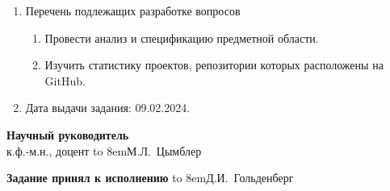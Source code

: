 \begin{adjustwidth}{-1.5cm}{0.5cm}
\begin{linespread}{1}
{\begin{enumerate}
	\bf\item Перечень подлежащих разработке вопросов\rm
	\begin{enumerate}
		\item Провести анализ и спецификацию предметной области.
		\item Изучить статистику проектов, репозитории которых расположены на GitHub.
	\end{enumerate}

	\bf\item Дата выдачи задания: \rm
	09.02.2024.
\end{enumerate}

\vspace{1em}

\noindent
\textbf{Научный руководитель}\\[0.5em]
к.ф.-м.н., доцент
\hfill
\hbox to 8em{М.Л.~Цымблер\hfill}

\vspace{1em}

\noindent
\textbf{Задание принял к исполнению}
\hfill
\hbox to 8em{Д.И.~Гольденберг\hfill}

}

\thispagestyle{empty}

\end{linespread}
\end{adjustwidth}

\pagebreak
